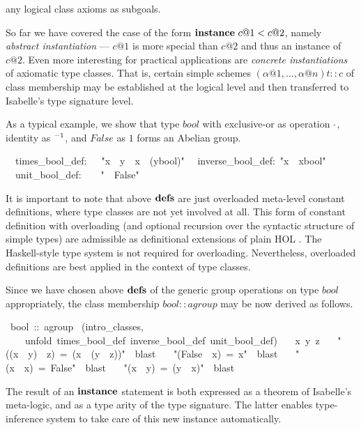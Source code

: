 \begin{isabelle}
\begin{isamarkuptext}
 any logical class axioms as subgoals.%
\end{isamarkuptext}%
%
%
\begin{isamarkuptext}%
So far we have covered the case of the form
 $\emph{\bf instance}~c@1 < c@2$, namely \emph{abstract
 instantiation} --- $c@1$ is more special than $c@2$ and thus an
 instance of $c@2$.  Even more interesting for practical applications
 are \emph{concrete instantiations} of axiomatic type classes.  That
 is, certain simple schemes $(\alpha@1, \ldots, \alpha@n)t :: c$ of
 class membership may be established at the logical level and then
 transferred to Isabelle's type signature level.

 \medskip As a typical example, we show that type $bool$ with
 exclusive-or as operation $\cdot$, identity as $\emph{${}^{-1}$}$, and
 $False$ as $1$ forms an Abelian group.%
\end{isamarkuptext}%
\isanewline
~~times\_bool\_def:~~~{"}x~{\isasymOtimes}~y~{\isasymequiv}~x~{\isasymnoteq}~(y{\isasymColon}bool){"}\isanewline
~~inverse\_bool\_def:~{"}x{\isasyminv}~{\isasymequiv}~x{\isasymColon}bool{"}\isanewline
~~unit\_bool\_def:~~~~{"}{\isasymunit}~{\isasymequiv}~False{"}%
\begin{isamarkuptext}%
\medskip It is important to note that above ${\mathord{\mathbf{defs}}}$ are just
 overloaded meta-level constant definitions, where type classes are
 not yet involved at all.  This form of constant definition with
 overloading (and optional recursion over the syntactic structure of
 simple types) are admissible as definitional extensions of plain HOL
 \cite{Wenzel:1997:TPHOL}.  The Haskell-style type system is not
 required for overloading.  Nevertheless, overloaded definitions are
 best applied in the context of type classes.

 \medskip Since we have chosen above ${\mathord{\mathbf{defs}}}$ of the generic group
 operations on type $bool$ appropriately, the class membership $bool
 :: agroup$ may be now derived as follows.%
\end{isamarkuptext}%
~bool~::~agroup\isanewline
{}~(intro\_classes,\isanewline
~~~~unfold~times\_bool\_def~inverse\_bool\_def~unit\_bool\_def)\isanewline
~~~x~y~z\isanewline
~~~{"}((x~{\isasymnoteq}~y)~{\isasymnoteq}~z)~=~(x~{\isasymnoteq}~(y~{\isasymnoteq}~z)){"}~~blast\isanewline
~~~{"}(False~{\isasymnoteq}~x)~=~x{"}~~blast\isanewline
~~~{"}(x~{\isasymnoteq}~x)~=~False{"}~~blast\isanewline
~~~{"}(x~{\isasymnoteq}~y)~=~(y~{\isasymnoteq}~x){"}~~blast\isanewline
{}%
\begin{isamarkuptext}%
The result of an $\emph{\bf instance}$ statement is both expressed
 as a theorem of Isabelle's meta-logic, and as a type arity of the
 type signature.  The latter enables type-inference system to take
 care of this new instance automatically.


\end{isamarkuptext}
\end{isabelle}
